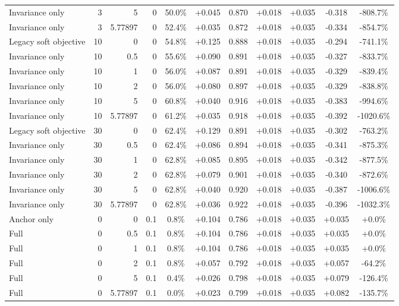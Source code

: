 \begin{table}[htbp]
\begin{tabular}{lrrrccccccc}
Invariance only & 3 & 5 & 0 & 50.0\% & +0.045 & 0.870 & +0.018 & +0.035 & -0.318 & -808.7\% \\
Invariance only & 3 & 5.77897 & 0 & 52.4\% & +0.035 & 0.872 & +0.018 & +0.035 & -0.334 & -854.7\% \\
Legacy soft objective & 10 & 0 & 0 & 54.8\% & +0.125 & 0.888 & +0.018 & +0.035 & -0.294 & -741.1\% \\
Invariance only & 10 & 0.5 & 0 & 55.6\% & +0.090 & 0.891 & +0.018 & +0.035 & -0.327 & -833.7\% \\
Invariance only & 10 & 1 & 0 & 56.0\% & +0.087 & 0.891 & +0.018 & +0.035 & -0.329 & -839.4\% \\
Invariance only & 10 & 2 & 0 & 56.0\% & +0.080 & 0.897 & +0.018 & +0.035 & -0.329 & -838.8\% \\
Invariance only & 10 & 5 & 0 & 60.8\% & +0.040 & 0.916 & +0.018 & +0.035 & -0.383 & -994.6\% \\
Invariance only & 10 & 5.77897 & 0 & 61.2\% & +0.035 & 0.918 & +0.018 & +0.035 & -0.392 & -1020.6\% \\
Legacy soft objective & 30 & 0 & 0 & 62.4\% & +0.129 & 0.891 & +0.018 & +0.035 & -0.302 & -763.2\% \\
Invariance only & 30 & 0.5 & 0 & 62.4\% & +0.086 & 0.894 & +0.018 & +0.035 & -0.341 & -875.3\% \\
Invariance only & 30 & 1 & 0 & 62.8\% & +0.085 & 0.895 & +0.018 & +0.035 & -0.342 & -877.5\% \\
Invariance only & 30 & 2 & 0 & 62.8\% & +0.079 & 0.901 & +0.018 & +0.035 & -0.340 & -872.6\% \\
Invariance only & 30 & 5 & 0 & 62.8\% & +0.040 & 0.920 & +0.018 & +0.035 & -0.387 & -1006.6\% \\
Invariance only & 30 & 5.77897 & 0 & 62.8\% & +0.036 & 0.922 & +0.018 & +0.035 & -0.396 & -1032.3\% \\
Anchor only & 0 & 0 & 0.1 & 0.8\% & +0.104 & 0.786 & +0.018 & +0.035 & +0.035 & +0.0\% \\
Full & 0 & 0.5 & 0.1 & 0.8\% & +0.104 & 0.786 & +0.018 & +0.035 & +0.035 & +0.0\% \\
Full & 0 & 1 & 0.1 & 0.8\% & +0.104 & 0.786 & +0.018 & +0.035 & +0.035 & +0.0\% \\
Full & 0 & 2 & 0.1 & 0.8\% & +0.057 & 0.792 & +0.018 & +0.035 & +0.057 & -64.2\% \\
Full & 0 & 5 & 0.1 & 0.4\% & +0.026 & 0.798 & +0.018 & +0.035 & +0.079 & -126.4\% \\
Full & 0 & 5.77897 & 0.1 & 0.0\% & +0.023 & 0.799 & +0.018 & +0.035 & +0.082 & -135.7\% \\

\end{tabular}
\end{table}
